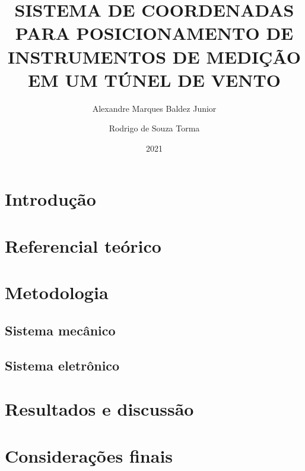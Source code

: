 \documentclass{beamer}
\title{SISTEMA DE COORDENADAS PARA POSICIONAMENTO DE INSTRUMENTOS DE MEDIÇÃO EM UM TÚNEL DE VENTO}
\author{Alexandre Marques Baldez Junior \and Rodrigo de Souza Torma}
\institute{Universidade Federal do Rio Grande}
\date{2021}
\begin{document}
\frame{\titlepage}

\section{Introdução}






\section{Referencial teórico}





\section{Metodologia}

\subsection{Sistema mecânico}




    
\subsection{Sistema eletrônico}
















\section{Resultados e discussão}
    
\section{Considerações finais}
\end{document}
